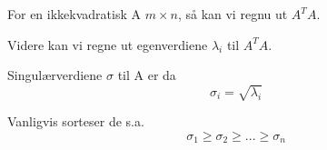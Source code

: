 For en ikkekvadratisk A $m\times n$, så kan vi regnu ut $A^TA$.

Videre kan vi regne ut egenverdiene $\lambda_i$ til $A^TA$.

Singulærverdiene $\sigma$ til A er da
$$\sigma_i = \sqrt{\lambda_i}$$

Vanligvis sorteser de s.a.
$$\sigma_1 \geq \sigma_2 \geq ... \geq \sigma_n$$
